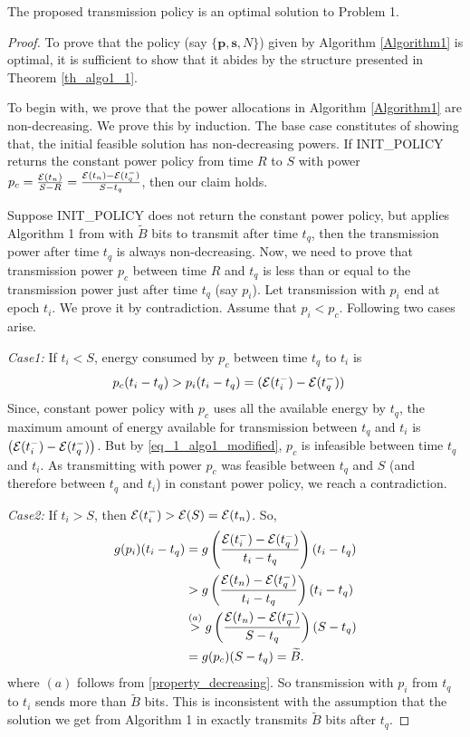 \begin{theorem}
The proposed transmission policy is an optimal solution to Problem 1.
\label{th_algo1_2}
\end{theorem}
\begin{proof}
To prove that the policy (say $\{\textbf{p},\textbf{s},N\}$) given by Algorithm \ref{Algorithm1} is optimal, it is sufficient to show that it abides by the structure presented in Theorem \ref{th_algo1_1}.

To begin with, we prove that the power allocations in Algorithm \ref{Algorithm1} are non-decreasing. We prove this by induction. The base case constitutes of showing that, the initial feasible solution has non-decreasing powers. If INIT\_POLICY returns the constant power policy from time $R$ to $S$ with power $p_c=\frac{\mathcal{E}(t_n)}{S-R}=\frac{\mathcal{E}(t_n)-\mathcal{E}(t_q^-)}{S-t_q}$, then our claim holds. 

Suppose INIT\_POLICY does not return the constant power policy, but applies Algorithm 1 from \cite{Yang} with $\widetilde{B}$ bits to transmit after time $t_q$, then the transmission power after time $t_q$ is always non-decreasing. Now, we need to prove that transmission power $p_c$ between time $R$ and $t_q$ is less than or equal to the transmission power just after time $t_q$ (say $p_i$). Let transmission with $p_i$ end at epoch $t_i$. We prove it by contradiction. Assume that $p_i<p_c$. Following two cases arise.

\textit{Case1:} If $t_i<S$, energy consumed by $p_c$ between time $t_q$ to $t_i$ is 
\begin{align}
&p_c(t_i-t_q)>p_i(t_i-t_q)=(\ETx(t_i^-)-\ETx(t_q^-))\label{eq_1_algo1_modified}
\end{align}
Since, constant power policy with $p_c$ uses all the available energy by $t_q$, the maximum amount of energy available for transmission between $t_q$ and $t_i$ is $\left(\mathcal{E}(t_i^-)-\mathcal{E}(t_q^-)\right)$. But by \eqref{eq_1_algo1_modified}, $p_c$ is infeasible between time $t_q$ and $t_i$. As transmitting with power $p_c$ was feasible between $t_q$ and $S$ (and therefore between $t_q$ and $t_i$) in constant power policy, we reach a contradiction.        

\textit{Case2:} If $t_i>S$, then $\mathcal{E}(t_i^-)>\mathcal{E}(S)=\mathcal{E}(t_n)$. So, 
\begin{align}
g(p_i)(t_i-t_q)&=g\left(\frac{\ETx(t_i^-)-\ETx(t_q^-)}{t_i-t_q}\right)(t_i-t_q)
\\
&>g\left(\frac{\ETx(t_n)-\ETx(t_q^-)}{t_i-t_q}\right)(t_i-t_q)
\\
&\stackrel{(a)}{>}g\left(\frac{\ETx(t_n)-\ETx(t_q^-)}{S-t_q}\right)(S-t_q)\label{eq_2_algo1_modified}
\\
&=g(p_c)(S-t_q)=\widetilde{B}.
\end{align}
where %
$(a)$ follows from \eqref{property_decreasing}. So transmission with $p_i$ from $t_q$ to $t_i$ sends more than $\widetilde{B}$ bits. This is inconsistent with the assumption that the solution we get from Algorithm 1 in \cite{Yang} exactly transmits $\widetilde{B}$ bits after $t_q$. 


\end{proof}
